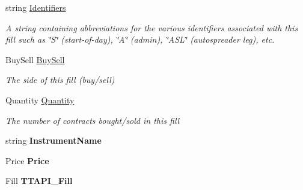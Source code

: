 \begin{DoxyCompactItemize}
string \hyperlink{class_e_z_a_p_i_1_1_containers_1_1_t_t_fill_ade039989a9fa8e950cf3809f5c897260}{Identifiers}
\begin{DoxyCompactList}\small\item\em A string containing abbreviations for the various identifiers associated with this fill such as \char`\"{}\-S\char`\"{} (start-\/of-\/day), \char`\"{}\-A\char`\"{} (admin), \char`\"{}\-A\-S\-L\char`\"{} (autospreader leg), etc. \end{DoxyCompactList}\item 
Buy\-Sell \hyperlink{class_e_z_a_p_i_1_1_containers_1_1_t_t_fill_a00b0834ed7a3024f196ebaae2c9ec778}{Buy\-Sell}
\begin{DoxyCompactList}\small\item\em The side of this fill (buy/sell) \end{DoxyCompactList}\item 
Quantity \hyperlink{class_e_z_a_p_i_1_1_containers_1_1_t_t_fill_ae0d2b9a683ba6f43e00b53896be7a332}{Quantity}
\begin{DoxyCompactList}\small\item\em The number of contracts bought/sold in this fill \end{DoxyCompactList}\item 
\hypertarget{class_e_z_a_p_i_1_1_containers_1_1_t_t_fill_a7eb92a309caec2a54b9fd84b0184c784}{string {\bfseries Instrument\-Name}}\label{class_e_z_a_p_i_1_1_containers_1_1_t_t_fill_a7eb92a309caec2a54b9fd84b0184c784}

\item 
\hypertarget{class_e_z_a_p_i_1_1_containers_1_1_t_t_fill_a742066dedd0540f7c3fc10140bcc2969}{Price {\bfseries Price}}\label{class_e_z_a_p_i_1_1_containers_1_1_t_t_fill_a742066dedd0540f7c3fc10140bcc2969}

\item 
\hypertarget{class_e_z_a_p_i_1_1_containers_1_1_t_t_fill_a9b1b93dba5b99449e1358c15019c8d8c}{Fill {\bfseries T\-T\-A\-P\-I\-\_\-\-Fill}}\label{class_e_z_a_p_i_1_1_containers_1_1_t_t_fill_a9b1b93dba5b99449e1358c15019c8d8c}


\end{DoxyCompactItemize}
